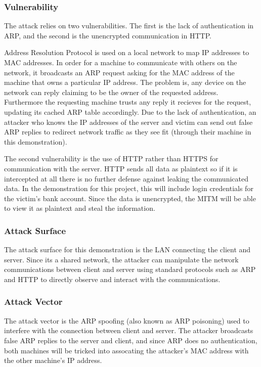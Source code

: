 \documentclass[11pt]{article}
\begin{document}
\subsubsection{Vulnerability}
\par The attack relies on two vulnerabilities. The first is the lack of authentication in ARP, and the second is the unencrypted communication in HTTP.

\par Address Resolution Protocol is used on a local network to map IP addresses to MAC addresses. In order for a machine to communicate with others on the network, it broadcasts an ARP request asking for the MAC address of the machine that owns a particular IP address. The problem is, any device on the network can reply claiming to be the owner of the requested address. Furthermore the requesting machine trusts any reply it recieves for the request, updating its cached ARP table accordingly. Due to the lack of authentication, an attacker who knows the IP addresses of the server and victim can send out false ARP replies to redirect network traffic as they see fit (through their machine in this demonstration).

\par The second vulnerability is the use of HTTP rather than HTTPS for communication with the server. HTTP sends all data as plaintext so if it is intercepted at all there is no further defense against leaking the communicated data. In the demonstration for this project, this will include login credentials for the victim's bank account. Since the data is unencrypted, the MITM will be able to view it as plaintext and steal the information.

\subsubsection{Attack Surface}
\par The attack surface for this demonstration is the LAN connecting the client and server. Since its a shared network, the attacker can manipulate the network communications between client and server using standard protocols such as ARP and HTTP to directly observe and interact with the communications.

\subsubsection{Attack Vector}
\par The attack vector is the ARP spoofing (also known as ARP poisoning) used to interfere with the connection between client and server. The attacker broadcasts false ARP replies to the server and client, and since ARP does no authentication, both machines will be tricked into assocating the attacker's MAC address with the other machine's IP address.
\end{document}
